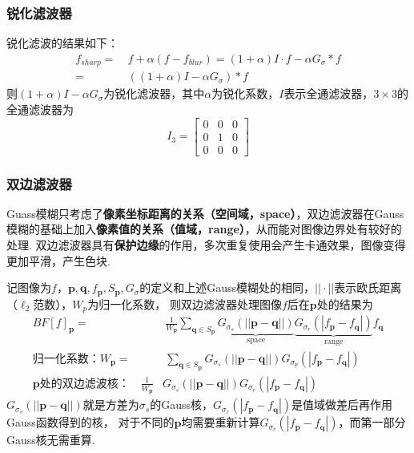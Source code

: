 \documentclass[12pt, a4paper, oneside]{ctexart}
\numberwithin{equation}{section}  %
\theoremstyle{definition}
\def\bd{\boldsymbol}        %
\begin{document}
\subsubsection{锐化滤波器}
锐化滤波的结果如下：
\begin{align*}
    f_{sharp} =&\ f+\alpha(f-f_{blur}) = (1+\alpha) I\cdot f - \alpha G_{\sigma} * f\\
    =&\ ((1+\alpha)I-\alpha G_\sigma)*f
\end{align*}
则$(1+\alpha)I-\alpha G_\sigma$为锐化滤波器，其中$\alpha$为锐化系数，$I$表示全通滤波器，$3\times 3$的全通滤波器为
\begin{equation*}
I_3 = \left[\begin{matrix}
    0&0&0\\
    0&1&0\\
    0&0&0
\end{matrix}\right]
\end{equation*}
\subsubsection{双边滤波器}  %
Guass模糊只考虑了\textbf{像素坐标距离的关系（空间域，space）}，双边滤波器在Gauss模糊的基础上加入\textbf{像素值的关系（值域，range）}，从而能对图像边界处有较好的处理.
双边滤波器具有\textbf{保护边缘}的作用，多次重复使用会产生卡通效果，图像变得更加平滑，产生色块.

记图像为$f$，$\bd{p},\bd{q},f_{\bd{p}},S_{\bd{p}},G_{\sigma}$的定义和上述Gauss模糊处的相同，$||\cdot||$表示欧氏距离（$\ell_2$范数），$W_p$为归一化系数，
则双边滤波器处理图像$f$后在$\bd{p}$处的结果为
\begin{align*}
    BF[f]_{\bd{p}} =&\ \frac{1}{W_{\bd{p}}}\sum_{\bd{q}\in S_{\bd{p}}}\underbrace{G_{\sigma_s}(||\bd{p}-\bd{q}||)}_{\text{space}}\underbrace{G_{\sigma_{r}}(|f_{\bd{p}} - f_{\bd{q}}|)}_{\text{range}}f_{\bd{q}}\\
    \text{归一化系数：}W_{\bd{p}} =&\ \sum_{\bd{q}\in S_{\bd{p}}}G_{\sigma_s}(||\bd{p}-\bd{q}||)G_{\sigma_{p}}(|f_{\bd{p}} - f_{\bd{q}}|)\\
    \bd{p}\text{处的双边滤波核：}\quad\frac{1}{W_{\bd{p}}}&G_{\sigma_s}(||\bd{p}-\bd{q}||)G_{\sigma_{r}}(|f_{\bd{p}} - f_{\bd{q}}|)
\end{align*}
$G_{\sigma_s}(||\bd{p}-\bd{q}||)$就是方差为$\sigma_s$的Gauss核，$G_{\sigma_{r}}(|f_{\bd{p}} - f_{\bd{q}}|)$是值域做差后再作用Gauss函数得到的核，
对于不同的$\bd{p}$均需要重新计算$G_{\sigma_{r}}(|f_{\bd{p}} - f_{\bd{q}}|)$，而第一部分Gauss核无需重算.
\end{document}
